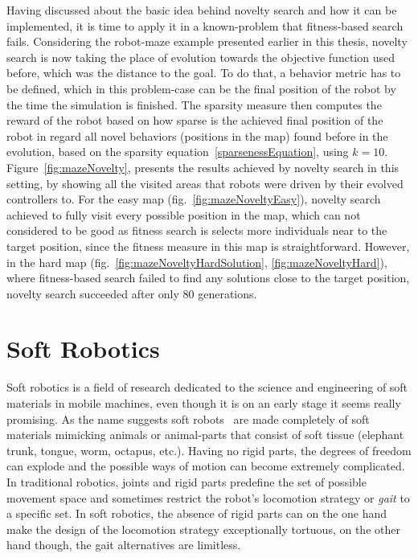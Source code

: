 Having discussed about the basic idea behind novelty search and how it can be implemented, it is time to apply it in a known-problem that fitness-based search fails. Considering the robot-maze example presented earlier in this thesis, novelty search is now taking the place of evolution towards the objective function used before, which was the distance to the goal. To do that, a behavior metric has to be defined, which in this problem-case can be the final position of the robot by the time the simulation is finished. The sparsity measure then computes the reward of the robot based on how sparse is the achieved final position of the robot in regard all novel behaviors (positions in the map) found before in the evolution, based on the sparsity equation~\ref{sparsenessEquation}, using $k = 10$. Figure~\ref{fig:mazeNovelty}, presents the results achieved by novelty search in this setting, by showing all the visited areas that robots were driven by their evolved controllers to. For the easy map (fig.~\ref{fig:mazeNoveltyEasy}), novelty search achieved to fully visit every possible position in the map, which can not considered to be good as  fitness search is selects more individuals near to the target position, since the fitness measure in this map is straightforward. However, in the hard map (fig.~\ref{fig:mazeNoveltyHardSolution}, \ref{fig:mazeNoveltyHard}), where fitness-based search failed to find any solutions close to the target position, novelty search succeeded after only $80$ generations.



\section{Soft Robotics}
Soft robotics is a field of research dedicated to the science and engineering of soft materials in mobile machines, even though it is on an early stage it seems really promising. As the name suggests soft robots~\cite{trivedi2008soft, pfeifer2012challenges} are made completely of soft materials mimicking animals or animal-parts that consist of soft tissue (elephant trunk, tongue, worm, octapus, etc.). Having no rigid parts, the degrees of freedom can explode and the possible ways of motion can become extremely complicated. In traditional robotics, joints and rigid parts predefine the set of possible movement space and sometimes restrict the robot's locomotion strategy or \emph{gait} to a specific set. In soft robotics, the absence of rigid parts can on the one hand make the design of the locomotion strategy exceptionally tortuous, on the other hand though, the gait alternatives are limitless.

